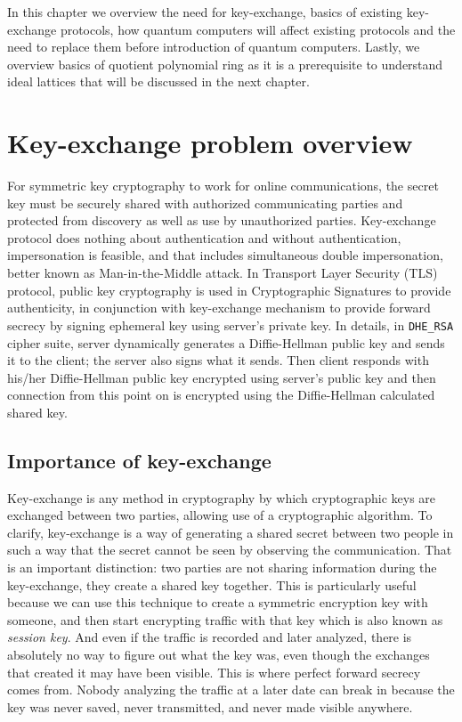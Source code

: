 In this chapter we overview the need for key-exchange, basics of existing key-exchange protocols, how quantum computers will affect existing protocols and the need to replace them before introduction of quantum computers. Lastly, we overview basics of quotient polynomial ring as it is a prerequisite to understand ideal lattices that will be discussed in the next chapter. 

\section{Key-exchange problem overview}
For symmetric key cryptography to work for online communications, the secret key must be securely shared with authorized communicating parties and protected from discovery as well as use by unauthorized parties. Key-exchange protocol does nothing about authentication and without authentication, impersonation is feasible, and that includes simultaneous double impersonation, better known as Man-in-the-Middle attack. In Transport Layer Security (TLS) protocol, public key cryptography is used in Cryptographic Signatures to provide authenticity, in conjunction with key-exchange mechanism to provide forward secrecy by signing ephemeral key using server's private key. In details, in \texttt{DHE\_RSA} cipher suite, server dynamically generates a Diffie-Hellman public key and sends it to the client; the server also signs what it sends. Then client responds with his/her Diffie-Hellman public key encrypted using server's public key and then connection from this point on is encrypted using the Diffie-Hellman calculated shared key.

\subsection{Importance of key-exchange}
Key-exchange is any method in cryptography by which cryptographic keys are exchanged between two parties, allowing use of a cryptographic algorithm. To clarify, key-exchange is a way of generating a shared secret between two people in such a way that the secret cannot be seen by observing the communication. That is an important distinction: two parties are not sharing information during the key-exchange, they create a shared key together. This is particularly useful because we can use this technique to create a symmetric encryption key with someone, and then start encrypting traffic with that key which is also known as \textit{session key}. And even if the traffic is recorded and later analyzed, there is absolutely no way to figure out what the key was, even though the exchanges that created it may have been visible. This is where perfect forward secrecy comes from. Nobody analyzing the traffic at a later date can break in because the key was never saved, never transmitted, and never made visible anywhere.


